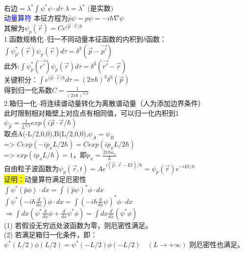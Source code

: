 \documentclass[a4paper,8pt]{extarticle} %
\newcommand{\bluetext}[1]{\textcolor{blue}{#1}}
\newcommand{\yellowback}[1]{\colorbox{yellow}{#1}}
\begin{document}
\begin{multicols}{3}
$\text{右边} = \lambda^*\int \psi^*\psi\cdot d\tau$
$\lambda = \lambda^* \text{ (是实数)}$\\
\bluetext{动量算符}
本征方程为$\hat{p}\psi = p\psi=-i\hbar\nabla\psi$\\
其解为$\psi_p(\vec{r}) = Ce^{i\vec{p}\cdot\vec{r}/\hbar}$\\
1.函数规格化--归一不同动量本征函数的内积到$\delta$函数：\\
$\int\psi^*_{p'}(\vec{r})\psi_{p}(\vec{r})d\tau = \delta^3(\vec{p}-\vec{p'})$\\
此外:$\int\psi^*_{p}(\vec{r'})\psi_{p}(\vec{r})d\tau = \delta^3(\vec{r'}-\vec{r})$\\
关键积分：$\int e^{i\vec{p}\cdot\vec{r}/\hbar}d\tau = (2\pi\hbar)^3\delta^3(\vec{p})$\\
得到归一化系数$C = \frac{1}{(2\pi\hbar)^{3/2}}$\\
2.箱归一化--将连续谱动量转化为离散谱动量（人为添加边界条件）\\
此时限制相对箱壁上对应点有相同值，可以归一化内积到1\\
$\psi_{\vec{p}}=\frac{1}{L^{3/2}}exp(i\vec{p}\cdot\vec{r}/\hbar)$\\
取点A(-L/2,0,0),B(L/2,0,0),$\psi_A=\psi_B$\\
=> $Cexp(-ip_xL/2\hbar)=Cexp(ip_xL/2\hbar)$\\
=> $exp(ip_xL/\hbar)=1$，即$p_x=\frac{2\pi\hbar n_x}{L}$\\
自由粒子波函数为$\psi_p(\vec{r},t)=Ae^{i(\vec{p}\cdot\vec{r}-Et)/\hbar}=\psi_p(\vec{r})e^{-iEt/\hbar}$\\
\yellowback{证明：}动量算符满足厄密性\\
$\int \psi^*(\hat{p}\phi)\cdot dx = \int(\hat{p}\psi)^*\phi\cdot dx$\\
$\int \psi^*(-i\hbar\frac{d}{dx})\phi\cdot dx = \int(-i\hbar\frac{d}{dx}\psi)^*\phi\cdot dx$\\
$\Rightarrow \int dx(\psi^*\frac{d}{dx}\phi + \frac{d}{dx}\psi^*\phi) = \int dx\frac{d}{dx}(\psi^*\phi)$\\
(1) 若假设无穷远处波函数为零，则厄密性满足。\\
(2) 若满足箱归一化条件，即：\\
$\psi^*(L/2)\phi(L/2) = \psi^*(-L/2)\phi(-L/2) \quad (L \rightarrow +\infty)$
则厄密性也满足。


\end{multicols}
\end{document}
